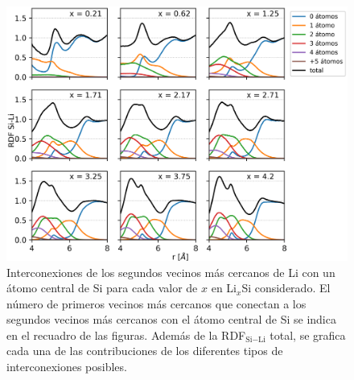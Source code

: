 \begin{figure}[h]
    \centering
    \includegraphics[width=\textwidth]{Silicio/caracterizacion/resultados/interconexion/interconexiones.png}
    \caption{Interconexiones de los segundos vecinos más cercanos de Li con un 
    átomo central de Si para cada valor de $x$ en Li$_x$Si considerado. El número 
    de primeros vecinos más cercanos que conectan a los segundos vecinos más 
    cercanos con el átomo central de Si se indica en el recuadro de las figuras. 
    Además de la RDF$_{\text{Si}-\text{Li}}$ total, se grafica cada una de las contribuciones 
    de los diferentes tipos de interconexiones posibles.}
    \label{fig:interconexiones}
\end{figure}

